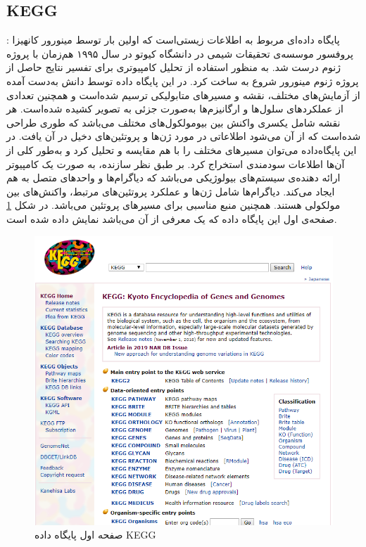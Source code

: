 \subsection{KEGG}

\cite{ogata1999kegg, kanehisa2000kegg}:
پایگاه داده‌ای مربوط به اطلاعات زیستی‌است که اولین بار توسط مینورور کانهیزا
پروفسور موسسه‌ی تحقیقات شیمی در دانشگاه کیوتو در سال ۱۹۹۵ هم‌زمان با پروژه ژنوم درست شد. به منظور استفاده از تحلیل کامپیوتری برای تفسیر نتایج حاصل از پروژه ژنوم مینورور شروع به ساخت
کرد. در این پایگاه داده توسط دانش به‌دست آمده از آزمایش‌های مختلف، نقشه و مسیرهای متابولیکی ترسیم شده‌‌است و همچنین تعدادی از عملکرد‌های سلول‌ها و ارگانیزم‌ها به‌صورت جزئی به تصویر کشیده‌ شده‌‌است. هر نقشه شامل یکسری واکنش بین بیومولکول‌های مختلف می‌باشد که طوری طراحی شده‌است که از آن می‌شود اطلاعاتی در مورد ژن‌ها و پروتئین‌های دخیل در آن یافت. در این پایگاه‌داده می‌توان مسیرهای مختلف را با هم مقایسه و تحلیل کرد و به‌طور کلی از آن‌ها اطلاعات سودمندی استخراج کرد.
بر طبق نظر سازنده‌، 
به صورت یک کامپیوتر ارائه دهنده‌ی سیستم‌های بیولوژیکی می‌باشد که دیاگرام‌ها و واحدهای متصل به هم ایجاد می‌کند. دیاگرام‌ها شامل ژن‌ها و عملکرد پروتئین‌های مرتبط، واکنش‌های بین مولکولی هستند. همچنین
منبع مناسبی برای مسیرهای پروتئین 
 می‌باشد. در شکل 
\ref{fs3} 
صفحه‌ی اول این پایگاه داده که یک معرفی از آن می‌باشد نمایش داده شده است.

\begin{figure}[h!]
	\centering
	\includegraphics[scale=0.7]{section1/kegg1.PNG}
	\caption{ 
صفحه اول پایگاه داده KEGG}
	\label{fs3}
\end{figure}

